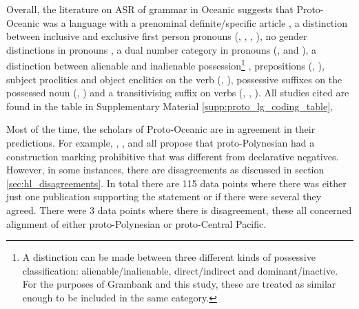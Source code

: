 \documentclass[12pt,letterpaper]{article}
\begin{document}
Overall, the literature on ASR of grammar in Oceanic suggests that Proto-Oceanic was a language with a prenominal definite/specific article \citep[136]{crowley1985common}, a distinction between inclusive and exclusive first person pronouns (\citet[112]{pawley1973some}, \citet[184]{crowley1985common}, \citet[500]{ross2004morphosyntactic}, \citet[67, 75]{lynchrosscrowley_proto_grammar_oceanic}), no gender distinctions in pronouns \citep[498]{ross2004morphosyntactic}, a dual number category in pronouns (\citet[498]{ross2004morphosyntactic}, \citet[69]{lynchrosscrowley_proto_grammar_oceanic} and \citet[173]{pawley1973some}), a distinction between alienable and inalienable possession\footnote{A distinction can be made between three different kinds of possessive classification: alienable/inalienable, direct/indirect and dominant/inactive. For the purposes of Grambank and this study, these are treated as similar enough to be included in the same category.} \citep[69]{lynchrosscrowley_proto_grammar_oceanic}, prepositions (\citet[167]{pawley1973some}, \citet[498]{ross2004morphosyntactic}), subject proclitics and object enclitics on the verb (\citet[498-499]{ross2004morphosyntactic}, \citet[83]{lynchrosscrowley_proto_grammar_oceanic}), possessive suffixes on the possessed noun (\citet[495]{ross2004morphosyntactic}, \citet[155]{pawley1973some}) and a transitivising suffix on verbs (\citet[352]{pawley1970change}, \citet[171]{pawley1973some}, \citet[80, 92]{lynchrosscrowley_proto_grammar_oceanic}). All studies cited are found in the table in Supplementary Material \ref{supp:proto_lg_coding_table},

Most of the time, the scholars of Proto-Oceanic are in agreement in their predictions. For example, \citet[142]{pawley1973some}, \citet[292]{ross2007two}, \citet[xiii, 125]{clark1973aspects} and \citet[89]{lynchrosscrowley_proto_grammar_oceanic} all propose that proto-Polynesian had a construction marking prohibitive that was different from declarative negatives. However, in some instances, there are disagreements as discussed in section \ref{sec:hl_disagreements}. In total there are 115 data points where there was either just one publication supporting the statement or if there were several they agreed. There were 3 data points where there is disagreement, these all concerned alignment of either proto-Polynesian or proto-Central Pacific.
\end{document}
